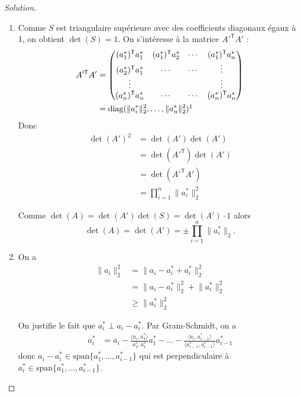 \documentclass[a4paper,12pt,french]{report}
\theoremstyle{plain}
\theoremstyle{definition}
\begin{document}
\begin{proof}[Solution]
\begin{enumerate}
\item Comme $S$ est triangulaire supérieure avec des coefficients diagonaux égaux à 1, on obtient $\det(S)=1$. On s'intéresse à la matrice $A'^{\mathsf{T}}A'$ :
\begin{align*}
A'^{\mathsf{T}}A' & =\begin{pmatrix}
(a_{1}^{*})^{\mathsf{T}}a_{1}^{*} & (a_{1}^{*})^{\mathsf{T}}a_{2}^{*} & \cdots & (a_{1}^{*})^{\mathsf{T}}a_{n}^{*} \\
(a_{2}^{*})^{\mathsf{T}}a_{1}^{*} & \cdots & \cdots & \vdots \\
\vdots &  &  & \vdots \\
(a_{n}^{*})^{\mathsf{T}}a_{n}^{*} & \cdots & \cdots & (a_{n}^{*})^{\mathsf{T}}a_{n}^{*}
\end{pmatrix} \\
 & =\mathrm{diag}(\lVert a_{i}^{*} \rVert_{2}^{2},\dots,\lVert a_{n}^{*} \rVert _{2}^{2} )\footnotemark{}
\end{align*}
Donc
\begin{align*}
\det(A')^{2} & =\det(A')\det(A') \\
 & =\det(A'^{\mathsf{T}})\det(A') \\
 & =\det(A'^{\mathsf{T}}A') \\
 & =\prod_{i=1}^{n} \lVert a_{i}^{*} \rVert _{2}^{2}
\end{align*}

Comme $\det(A)=\det(A')\det(S)=\det(A')\cdot 1$ alors $$\det(A)=\det(A')=\pm \prod_{i=1}^{n}\lVert a_{i}^{*} \rVert_{2}.$$
\item On a
\begin{align*}
\lVert a_{i} \rVert _{2}^{2} & =\lVert a_{i}-a_{i}^{*} +a_{i}^{*}  \rVert_{2}^{2} \\
 & =\lVert a_{i}-a_{i}^{*} \rVert _{2}^{2} +\lVert a_{i}^{*} \rVert _{2}^{2} \\
 & \ge \lVert a_{i}^{*} \rVert _{2}^{2} 
\end{align*}

On justifie le fait que $a_{i}^{*}\perp a_{i}-a_{i}^{*}$. Par Gram-Schmidt, on a
\begin{align*}
a_{i}^{*} & =a_{i}-\frac{\langle a_{i},a_{1}^{*} \rangle }{a_{1}^{*},a_{1}^{*}}a_{1}^{*}-\dots - \frac{\langle a_{i},a_{i-1}^{*} \rangle }{\langle a_{i-1}^{*},a_{i-1}^{*} \rangle }a_{i-1}^{*}
\end{align*}
donc $a_{i}-a_{i}^{*}\in \mathrm{span}\{ a_{1}^{*},\dots,a_{i-1}^{*} \}$ qui est perpendiculaire à $a_{i}^{*}\in \mathrm{span}\{ a_{1}^{*},\dots,a_{i-1}^{*} \}$.
\end{enumerate}


\end{proof}
\end{document}
